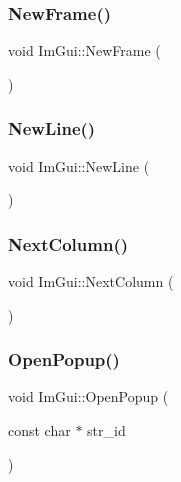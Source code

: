 \hypertarget{namespace_im_gui_ab3f1fc018f903b7ad79fd10663375774}{}\label{namespace_im_gui_ab3f1fc018f903b7ad79fd10663375774} 
\subsubsection{\texorpdfstring{New\+Frame()}{NewFrame()}}
{\footnotesize\ttfamily void Im\+Gui\+::\+New\+Frame (\begin{DoxyParamCaption}{ }\end{DoxyParamCaption})}

\hypertarget{namespace_im_gui_a77f8b0a33e5335f98661f99e720411da}{}\label{namespace_im_gui_a77f8b0a33e5335f98661f99e720411da} 
\subsubsection{\texorpdfstring{New\+Line()}{NewLine()}}
{\footnotesize\ttfamily void Im\+Gui\+::\+New\+Line (\begin{DoxyParamCaption}{ }\end{DoxyParamCaption})}

\hypertarget{namespace_im_gui_a8f97746d6a9d59c8400c26fb7613a2ff}{}\label{namespace_im_gui_a8f97746d6a9d59c8400c26fb7613a2ff} 
\subsubsection{\texorpdfstring{Next\+Column()}{NextColumn()}}
{\footnotesize\ttfamily void Im\+Gui\+::\+Next\+Column (\begin{DoxyParamCaption}{ }\end{DoxyParamCaption})}

\hypertarget{namespace_im_gui_a9576648c40b92f54b671e2e51654dd2c}{}\label{namespace_im_gui_a9576648c40b92f54b671e2e51654dd2c} 
\subsubsection{\texorpdfstring{Open\+Popup()}{OpenPopup()}}
{\footnotesize\ttfamily void Im\+Gui\+::\+Open\+Popup (\begin{DoxyParamCaption}\item[{const char $\ast$}]{str\+\_\+id }\end{DoxyParamCaption})}

